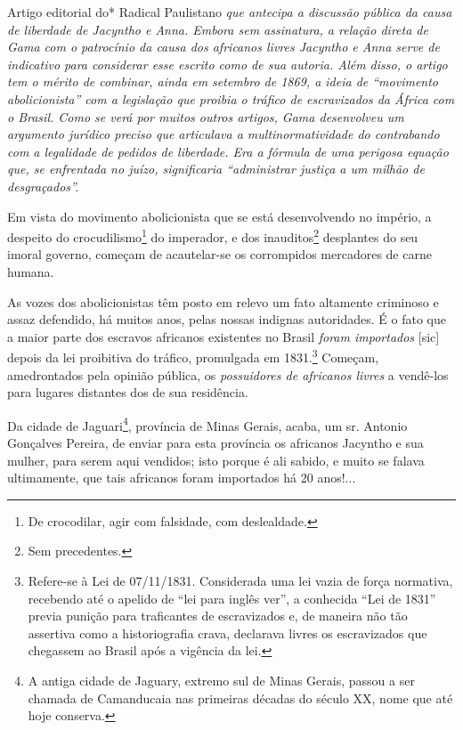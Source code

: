 \begin{didascalia}
Artigo editorial do* Radical Paulistano \emph{que antecipa a discussão
pública da causa de liberdade de Jacyntho e Anna. Embora sem assinatura,
a relação direta de Gama com o patrocínio da causa dos africanos livres
Jacyntho e Anna serve de indicativo para considerar esse escrito como de
sua autoria. Além disso, o artigo tem o mérito de combinar, ainda em
setembro de 1869, a ideia de ``movimento abolicionista'' com a legislação
que proibia o tráfico de escravizados da África com o Brasil. Como se
verá por muitos outros artigos, Gama desenvolveu um argumento jurídico
preciso que articulava a multinormatividade do contrabando com a
legalidade de pedidos de liberdade. Era a fórmula de uma perigosa
equação que, se enfrentada no juízo, significaria ``administrar justiça a
um milhão de desgraçados''.}
\end{didascalia}

\asterisc{}

Em vista do movimento abolicionista que se está desenvolvendo no
império, a despeito do crocudilismo\footnote{De crocodilar, agir com
  falsidade, com deslealdade.} do imperador, e dos inauditos\footnote{
  Sem precedentes.} desplantes do seu imoral governo, começam de
acautelar-se os corrompidos mercadores de carne humana.

As vozes dos abolicionistas têm posto em relevo um fato altamente
criminoso e assaz defendido, há muitos anos, pelas nossas indignas
autoridades. É o fato que a maior parte dos escravos africanos
existentes no Brasil \emph{foram importados} {[}sic{]} depois da lei
proibitiva do tráfico, promulgada em 1831.\footnote{Refere-se à Lei de
  07/11/1831. Considerada uma lei vazia de força normativa, recebendo
  até o apelido de ``lei para inglês ver'', a conhecida ``Lei de 1831''
  previa punição para traficantes de escravizados e, de maneira não tão
  assertiva como a historiografia crava, declarava livres os
  escravizados que chegassem ao Brasil após a vigência da lei.} Começam,
amedrontados pela opinião pública, os \emph{possuidores de africanos
livres} a vendê-los para lugares distantes dos de sua residência.

Da cidade de Jaguari\footnote{A antiga cidade de Jaguary, extremo sul
  de Minas Gerais, passou a ser chamada de Camanducaia nas primeiras
  décadas do século XX, nome que até hoje conserva.}, província de Minas
Gerais, acaba, um sr. Antonio Gonçalves Pereira, de enviar para esta
província os africanos Jacyntho e sua mulher, para serem aqui vendidos;
isto porque é ali sabido, e muito se falava ultimamente, que tais
africanos foram importados há 20 anos!...

